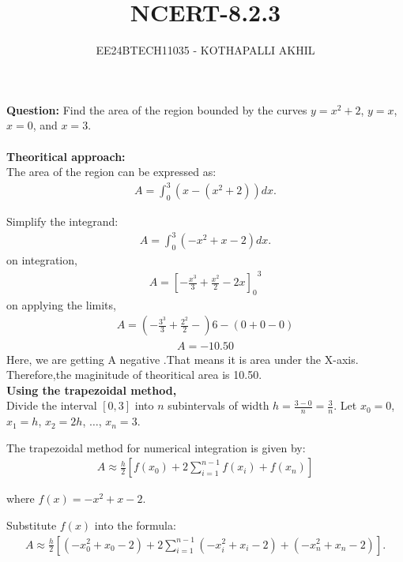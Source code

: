 \documentclass[article]{IEEEtran}
\numberwithin{figure}{enumi}
\begin{document}

\title{NCERT-8.2.3}
\author{EE24BTECH11035 - KOTHAPALLI AKHIL}
{\let\newpage\relax\maketitle}

\noindent\textbf{Question: }  
Find the area of the region bounded by the curves $y = x^2 + 2$, $y = x$, $x = 0$, and $x = 3$.\\
\solution \\
\textbf{Theoritical approach: }\\
The area of the region can be expressed as:
\begin{align}
   A = \int_0^3 \left( x - (x^2 + 2) \right) dx. 
\end{align}

Simplify the integrand:
\begin{align}
A = \int_0^3 \left( -x^2 + x - 2 \right) dx.
\end{align}
on integration,
\begin{align}
    A={\left[-\frac{x^3}{3}+\frac{x^2}{2}-2x\right]_0}^3
\end{align}
on applying the limits,
\begin{align}
   A=(-\frac{3^3}{3}+\frac{2^2}{2}-)6-(0+0-0)
\end{align}
\begin{align}
    A=-10.50
\end{align}
Here, we are getting A negative .That means it is area under the X-axis.
Therefore,the maginitude of theoritical area is 10.50.\\
\textbf{Using the trapezoidal method,}\\ Divide the interval $[0, 3]$ into $n$ subintervals of width $h = \frac{3-0}{n} = \frac{3}{n}$. Let $x_0 = 0$, $x_1 = h$, $x_2 = 2h$, $\dots$, $x_n = 3$.

The trapezoidal method for numerical integration is given by:
\begin{align}
  A \approx \frac{h}{2} \left[ f(x_0) + 2\sum_{i=1}^{n-1} f(x_i) + f(x_n) \right]  
\end{align}

where $f(x) = -x^2 + x - 2$.

Substitute $f(x)$ into the formula:
\begin{align}
    A \approx \frac{h}{2} \left[ (-x_0^2 + x_0 - 2) + 2\sum_{i=1}^{n-1} (-x_i^2 + x_i - 2) + (-x_n^2 + x_n - 2) \right].
\end{align}
\end{document}
